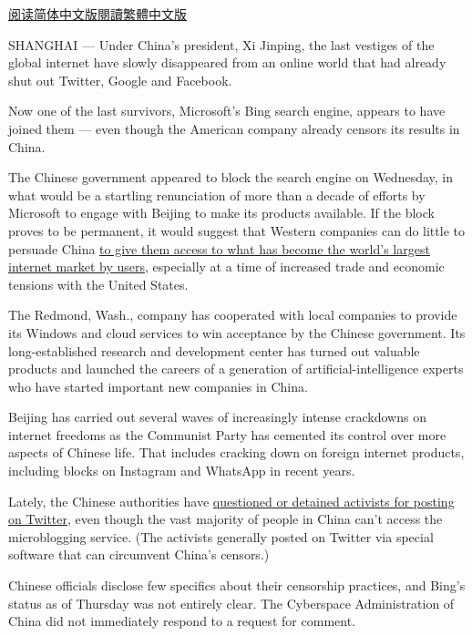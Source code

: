 \href{https://cn.nytimes3xbfgragh.onion/business/20190124/china-microsoft-bing/}{阅读简体中文版}\href{https://cn.nytimes3xbfgragh.onion/business/20190124/china-microsoft-bing/zh-hant/}{閱讀繁體中文版}

SHANGHAI --- Under China's president, Xi Jinping, the last vestiges of
the global internet have slowly disappeared from an online world that
had already shut out Twitter, Google and Facebook.

Now one of the last survivors, Microsoft's Bing search engine, appears
to have joined them --- even though the American company already censors
its results in China.

The Chinese government appeared to block the search engine on Wednesday,
in what would be a startling renunciation of more than a decade of
efforts by Microsoft to engage with Beijing to make its products
available. If the block proves to be permanent, it would suggest that
Western companies can do little to persuade China
\href{https://www.nytimes3xbfgragh.onion/2018/03/23/technology/trump-china-tariffs-tech-cold-war.html}{to
give them access to what has become the world's largest internet market
by users}, especially at a time of increased trade and economic tensions
with the United States.

The Redmond, Wash., company has cooperated with local companies to
provide its Windows and cloud services to win acceptance by the Chinese
government. Its long-established research and development center has
turned out valuable products and launched the careers of a generation of
artificial-intelligence experts who have started important new companies
in China.

Beijing has carried out several waves of increasingly intense crackdowns
on internet freedoms as the Communist Party has cemented its control
over more aspects of Chinese life. That includes cracking down on
foreign internet products, including blocks on Instagram and WhatsApp in
recent years.

Lately, the Chinese authorities have
\href{https://www.nytimes3xbfgragh.onion/2019/01/10/business/china-twitter-censorship-online.html}{questioned
or detained activists for posting on Twitter}, even though the vast
majority of people in China can't access the microblogging service. (The
activists generally posted on Twitter via special software that can
circumvent China's censors.)

Chinese officials disclose few specifics about their censorship
practices, and Bing's status as of Thursday was not entirely clear. The
Cyberspace Administration of China did not immediately respond to a
request for comment.

